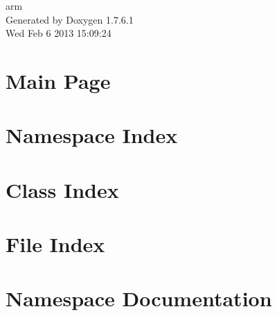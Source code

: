 \documentclass[a4paper]{book}
\begin{document}
\begin{titlepage}
\vspace*{7cm}
\begin{center}
{\Large arm }\\
\vspace*{1cm}
{\large \-Generated by Doxygen 1.7.6.1}\\
\vspace*{0.5cm}
{\small Wed Feb 6 2013 15:09:24}\\
\end{center}
\end{titlepage}
\clearemptydoublepage
{}
\tableofcontents
\clearemptydoublepage
{}
\chapter{\-Main \-Page}
\label{index}
\chapter{\-Namespace \-Index}

\chapter{\-Class \-Index}

\chapter{\-File \-Index}

\chapter{\-Namespace \-Documentation}










\end{document}
